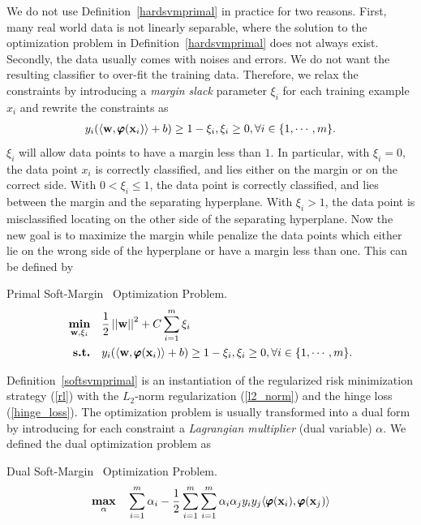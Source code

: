 {%
We do not use Definition~\ref{hardsvmprimal} in practice for two reasons. 
First, many real world data is not linearly separable, where the solution to the optimization problem in Definition~\ref{hardsvmprimal} does not always exist.
Secondly, the data usually comes with noises and errors.
We do not want the resulting classifier to over-fit the training data.
Therefore, we relax the constraints by introducing a \textit{margin slack} parameter $\xi_i$ for each training example $x_i$ and rewrite the constraints as 
\begin{align}
	y_i(\langle \mathbf {w}, \pmb \varphi(\mathbf {x}_i) \rangle + b) \ge 1-\xi_i, \xi_i\ge 0, \forall i\in\{1,\cdots,m\}. \label{softsvmconstraint}
\end{align}
$\xi_i$ will allow data points to have a margin less than $1$.
In particular, with $\xi_i=0$, the data point $x_i$ is correctly classified, and lies either on the margin or on the correct side.
With $0<\xi_i\le 1$, the data point is correctly classified, and lies between the margin and the separating hyperplane.
With $\xi_i>1$, the data point is misclassified locating on the other side of the separating hyperplane.
Now the new goal is to maximize the margin while penalize the data points which either lie on the wrong side of the hyperplane or have a margin less than one.
This can be defined by
\begin{definition}{Primal Soft-Margin \svm\ Optimization Problem.}\label{softsvmprimal}
	\begin{align*}
		\underset{\mathbf {w},\xi_i}{\textbf{min}} & \quad\frac{1}{2}\left|\left| \mathbf {w} \right|\right|^2 + C\sum_{i=1}^{m}\xi_i\\
		\textbf{s.t.} & \quad y_i(\langle \mathbf {w}, \pmb \varphi(\mathbf {x}_i) \rangle + b) \ge 1-\xi_i, \xi_i\ge 0, \forall i\in\{1,\cdots,m\}.
	\end{align*}
\end{definition}
\noindent
Definition~\ref{softsvmprimal} is an instantiation of the regularized risk minimization strategy (\ref{rl}) with the $L_2$-norm regularization (\ref{l2_norm}) and the hinge loss (\ref{hinge_loss}).
The optimization problem is usually transformed into a dual form by introducing for each constraint a \textit{Lagrangian multiplier} (dual variable) $\alpha$.
We defined the dual optimization problem as
\begin{definition}{Dual Soft-Margin \svm\ Optimization Problem.}\label{softsvmdual}
	\begin{align*}
		\underset{\valpha}{\maximize} & \quad\sum_{i=1}^{m}\alpha_i -\frac{1}{2}\sum_{i=1}^{m}\sum_{i=1}^{m}\alpha_i\alpha_jy_iy_j\ip{\varphib(\vx_i)}{\varphib(\vx_j)}\\

\end{align*}
\end{definition}}
